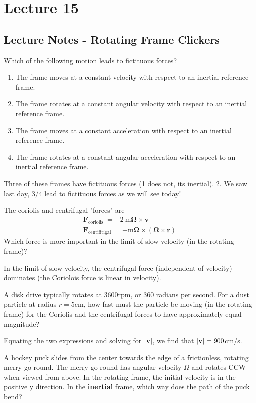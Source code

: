 \documentclass[../PHYS306Notes.tex]{subfiles}
\begin{document}
\section{Lecture 15}
\subsection{Lecture Notes - Rotating Frame Clickers}
Which of the following motion leads to fictituous forces?
\begin{enumerate}[1.]
    \item The frame moves at a constant velocity with respect to an inertial reference frame.
    \item The frame rotates at a constant angular velocity with respect to an inertial reference frame.
    \item The frame moves at a constant acceleration with respect to an inertial reference frame.
    \item The frame rotates at a constant angular acceleration with respect to an inertial reference frame.
\end{enumerate}
\begin{s}
Three of these frames have fictituous forces (1 does not, its inertial). 2. We saw last day, 3/4 lead to fictituous forces as we will see today!
\end{s}
\noindent The coriolis and centrifugal "forces" are
$$
\begin{array}{l}
\mathbf{F}_{\text {coriolis }}=-2 \mathrm{~m} \boldsymbol{\Omega} \times \mathbf{v} \\
\mathbf{F}_{\text {centifitigal }}=-\mathrm{m} \boldsymbol{\Omega} \times(\boldsymbol{\Omega} \times \mathbf{r})
\end{array}
$$
Which force is more important in the limit of slow velocity (in the rotating frame)?
\begin{s}
In the limit of slow velocity, the centrifugal force (independent of velocity) dominates (the Coriolois force is linear in velocity).
\end{s}
A disk drive typically rotates at $3600$rpm, or $360$ radians per second. For a dust particle at radius $r = 5$cm, how fast must the particle be moving (in the rotating frame) for the Coriolis and the centrifugal forces to have approximately equal magnitude?
\begin{s}
Equating the two expressions and solving for $\abs{\mathbf{v}}$, we find that $\abs{\mathbf{v}} = 900$cm/s.
\end{s}
\noindent A hockey puck slides from the center towards the edge of a frictionless, rotating merry-go-round. The merry-go-round has angular velocity $\Omega$ and rotates CCW when viewed from above. In the rotating frame, the initial velocity is in the positive y direction. In the \textbf{inertial} frame, which way does the path of the puck bend?
\end{document}
